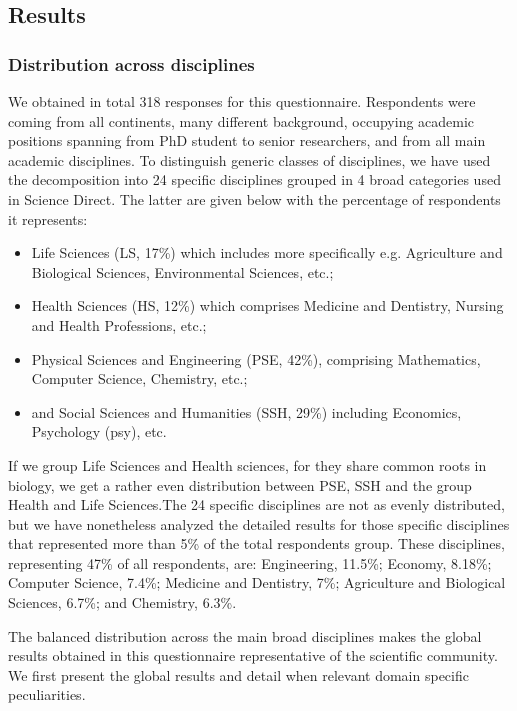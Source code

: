 \documentclass[runningheads,a4paper]{llncs}
\begin{document}
\subsection{Results}

\subsubsection{Distribution across disciplines}

We obtained in total 318 responses for this questionnaire. Respondents were coming from all continents, many different background, occupying academic positions spanning from PhD student to senior researchers, and from all main academic disciplines. To distinguish generic classes of disciplines, we have used the decomposition into 24 specific disciplines grouped in 4 broad categories used in Science Direct. The latter are given below with the percentage of respondents it represents:
\begin{itemize}
\item Life Sciences (LS, 17\%) which includes more specifically e.g. Agriculture and Biological Sciences, Environmental Sciences, etc.;
\item Health Sciences (HS, 12\%) which comprises Medicine and Dentistry, Nursing and Health Professions, etc.;
\item Physical Sciences and Engineering (PSE, 42\%), comprising Mathematics, Computer Science, Chemistry, etc.;
\item and Social Sciences and Humanities (SSH, 29\%) including Economics, Psychology (psy), etc.
\end{itemize}

If we group Life Sciences and Health sciences, for they share common roots in biology, we get a rather even distribution between PSE, SSH and the group Health and Life Sciences.The 24 specific disciplines are not as evenly distributed, but we have nonetheless analyzed the detailed results for those specific disciplines that represented more than 5\% of the total respondents group. These disciplines, representing 47\% of all respondents, are: Engineering, 11.5\%; Economy, 8.18\%; Computer Science, 7.4\%; Medicine and Dentistry, 7\%; Agriculture and Biological Sciences, 6.7\%; and Chemistry, 6.3\%.

The balanced distribution across the main broad disciplines makes the global results obtained in this questionnaire representative of the scientific community. We first present the global results and detail when relevant domain specific peculiarities.
\end{document}
